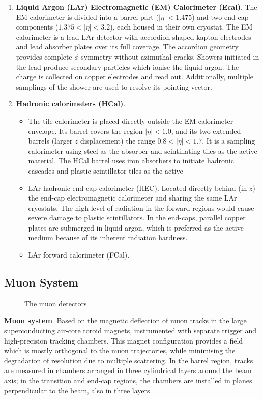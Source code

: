 %
\begin{enumerate}
    \item \textbf{Liquid Argon (LAr) Electromagnetic (EM) Calorimeter (Ecal)}. The EM calorimeter is divided into a barrel part ($|\eta| < 1.475$) and two end-cap components ($1.375 < |\eta| < 3.2$), each housed in their own cryostat. The EM calorimeter is a lead-LAr detector with accordion-shaped kapton electrodes and lead absorber plates over its full coverage. The accordion geometry provides complete $\phi$ symmetry without azimuthal cracks. Showers initiated in the lead produce secondary particles which ionise the liquid argon. The charge is collected on copper electrodes and read out. Additionally, multiple samplings of the shower are used to resolve its pointing vector.
    \item \textbf{Hadronic calorimeters (HCal)}. 
    \begin{itemize}
        \item The tile calorimeter is placed directly outside the EM calorimeter envelope. Its barrel covers the region $|\eta| < 1.0$, and its two extended barrels (larger $z$ displacement) the range $0.8 < |\eta| < 1.7$. It is a sampling calorimeter using steel as the absorber and scintillating tiles as the active material. The HCal barrel uses iron absorbers to initiate hadronic cascades and plastic scintillator tiles as the active
        \item LAr hadronic end-cap calorimeter (HEC). Located directly behind (in $z$) the end-cap electromagnetic calorimeter and sharing the same LAr cryostats. The high level of radiation in the forward regions would cause severe damage to plastic scintillators. In the end-caps, parallel copper plates are submerged in liquid argon, which is preferred as the active medium because of its inherent radiation hardness.
        \item LAr forward calorimeter (FCal).
    \end{itemize}
\end{enumerate}

\subsection{Muon System}
%
\begin{figure}[ht]
    \centering
    \caption{The muon detectors}
    \label{fig:ATLAS-muon}
\end{figure}
%
\item \textbf{Muon system}. Based on the magnetic deflection of muon tracks in the large superconducting air-core toroid magnets, instrumented with separate trigger and high-precision tracking chambers. This magnet configuration provides a field which is mostly orthogonal to the muon trajectories, while minimising the degradation of resolution due to multiple scattering. In the barrel region, tracks are measured in chambers arranged in three cylindrical layers around the beam axis; in the transition and end-cap regions, the chambers are installed in planes perpendicular to the beam, also in three layers.



